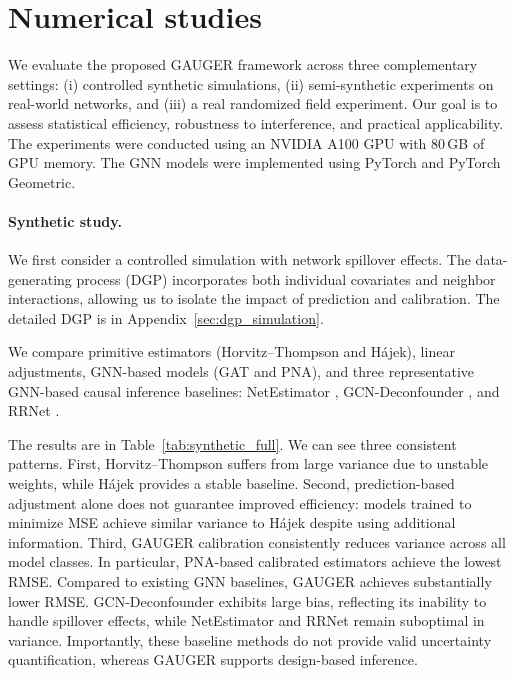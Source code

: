 \documentclass[twoside]{article}
\theoremstyle{plain}
\theoremstyle{definition}
\theoremstyle{remark}
\begin{document}
\section{Numerical studies}
\label{sec:simulation}

We evaluate the proposed GAUGER framework across three complementary settings: (i) controlled synthetic simulations, (ii) semi-synthetic experiments on real-world networks, and (iii) a real randomized field experiment. Our goal is to assess statistical efficiency, robustness to interference, and practical applicability.
The experiments were conducted using an NVIDIA A100 GPU with 80\,GB of GPU memory. The GNN models were implemented using PyTorch and PyTorch Geometric.

\paragraph{Synthetic study.}
We first consider a controlled simulation with network spillover effects. The data-generating process (DGP) incorporates both individual covariates and neighbor interactions, allowing us to isolate the impact of prediction and calibration. The detailed DGP is in Appendix~\ref{sec:dgp_simulation}.

We compare primitive estimators (Horvitz--Thompson and H\'{a}jek), linear adjustments, GNN-based models (GAT and PNA), and three representative GNN-based causal inference baselines: NetEstimator \citep{jiang2022estimating}, GCN-Deconfounder \citep{guo2020learning}, and RRNet \citep{cai2023generalization}.

The results are in Table~\ref{tab:synthetic_full}. We can see three consistent patterns. First, Horvitz--Thompson suffers from large variance due to unstable weights, while H\'{a}jek provides a stable baseline. Second, prediction-based adjustment alone does not guarantee improved efficiency: models trained to minimize MSE achieve similar variance to H\'{a}jek despite using additional information. Third, GAUGER calibration consistently reduces variance across all model classes. In particular, PNA-based calibrated estimators achieve the lowest RMSE.
Compared to existing GNN baselines, GAUGER achieves substantially lower RMSE. GCN-Deconfounder exhibits large bias, reflecting its inability to handle spillover effects, while NetEstimator and RRNet remain suboptimal in variance. Importantly, these baseline methods do not provide valid uncertainty quantification, whereas GAUGER supports design-based inference.
\end{document}
